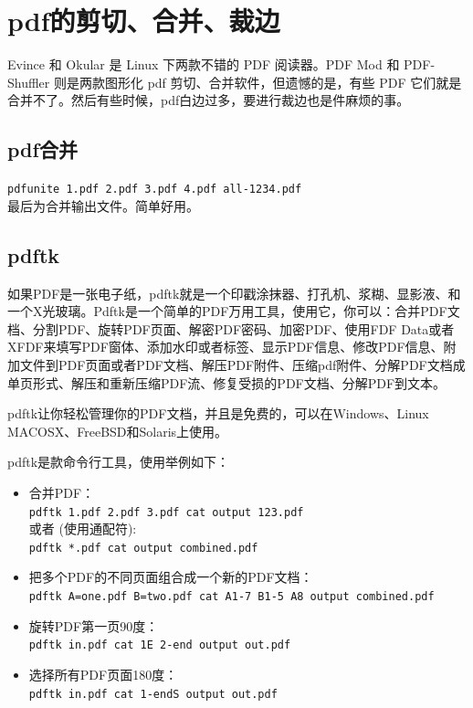 {\section{pdf的剪切、合并、裁边}
Evince 和 Okular 是 Linux 下两款不错的 PDF 阅读器。PDF Mod 和 PDF-Shuffler 则是两款图形化 pdf 剪切、合并软件，但遗憾的是，有些 PDF 它们就是合并不了。然后有些时候，pdf白边过多，要进行裁边也是件麻烦的事。

\subsection{pdf合并}
\verb|pdfunite 1.pdf 2.pdf 3.pdf 4.pdf all-1234.pdf|\\
最后为合并输出文件。简单好用。

\subsection{pdftk}
如果PDF是一张电子纸，pdftk就是一个印戳涂抹器、打孔机、浆糊、显影液、和一个X光玻璃。Pdftk是一个简单的PDF万用工具，使用它，你可以：合并PDF文档、分割PDF、旋转PDF页面、解密PDF密码、加密PDF、使用FDF Data或者XFDF来填写PDF窗体、添加水印或者标签、显示PDF信息、修改PDF信息、附加文件到PDF页面或者PDF文档、解压PDF附件、压缩pdf附件、分解PDF文档成单页形式、解压和重新压缩PDF流、修复受损的PDF文档、分解PDF到文本。

pdftk让你轻松管理你的PDF文档，并且是免费的，可以在Windows、Linux MACOSX、FreeBSD和Solaris上使用。

pdftk是款命令行工具，使用举例如下：
\begin{itemize}
\item 合并PDF：\\
\verb|pdftk 1.pdf 2.pdf 3.pdf cat output 123.pdf|\\
或者 (使用通配符):\\
\verb|pdftk *.pdf cat output combined.pdf|

\item 把多个PDF的不同页面组合成一个新的PDF文档：\\
\verb|pdftk A=one.pdf B=two.pdf cat A1-7 B1-5 A8 output combined.pdf|

\item 旋转PDF第一页90度：\\
\verb|pdftk in.pdf cat 1E 2-end output out.pdf|

\item 选择所有PDF页面180度：\\
\verb|pdftk in.pdf cat 1-endS output out.pdf|


\end{itemize}}
